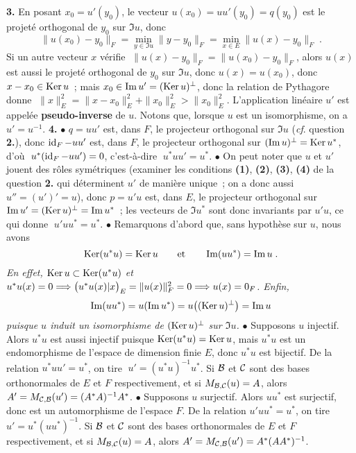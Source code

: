 \documentclass{article}
\begin{document}
\msk
{\bf 3.} En posant $x_0=u'(y_0)$, le vecteur $u(x_0)=uu'(y_0)=q(y_0)$ est le projet\'e orthogonal de $y_0$ sur $\Im u$, donc\vvvv
$$\|u(x_0)-y_0\|_F=\min_{y\in\Im u}\|y-y_0\|_F=\min_{x\in E}\|u(x)-y_0\|_F\;.$$\sect
Si un autre vecteur $x$ v\'erifie $\;\|u(x)-y_0\|_F=\|u(x_0)-y_0\|_F$, alors $u(x)$ est aussi le projet\'e orthogonal de $y_0$ sur $\Im u$, donc $u(x)=u(x_0)$, donc $x-x_0\in\mathop{\rm Ker}\nolimits u$~; mais $x_0\in\mathop{\rm Im}\nolimits u'=(\mathop{\rm Ker}\nolimits u)^\perp$, donc la relation de Pythagore donne $\;\|x\|_E^2=\|x-x_0\|_E^2+\|x_0\|_E^2>\|x_0\|_E^2$.\msk\sect
L'application lin\'eaire $u'$ est appel\'ee {\bf pseudo-inverse} de $u$. Notons que, lorsque $u$ est un isomorphisme, on a $u'=u^{-1}$.
\msk
{\bf 4.} $\bullet$ $q=uu'$ est, dans $F$, le projecteur orthogonal sur $\Im u$ ({\it cf}. question {\bf 2.}), donc $\mathop{\rm id}\nolimits_F-uu'$ est, dans $F$, le projecteur orthogonal sur $(\mathop{\rm Im}\nolimits u)^\perp=\mathop{\rm Ker}\nolimits u^*$, d'o\`u $\;u^*(\mathop{\rm id}\nolimits_F-uu')=0$, c'est-\`a-dire $\;u^*uu'=u^*$.
\msk\sect
$\bullet$ On peut noter que $u$ et $u'$ jouent des r\^oles sym\'etriques (examiner les conditions {\bf (1)}, {\bf (2)}, {\bf (3)}, {\bf (4)} de la question {\bf 2.} qui d\'eterminent $u'$ de mani\`ere unique~; on a donc aussi $u''=(u')'=u$), donc $p=u'u$ est, dans $E$, le projecteur orthogonal sur $\mathop{\rm Im}\nolimits u'=(\mathop{\rm Ker}\nolimits u)^\perp=\mathop{\rm Im}\nolimits u^*$~; les vecteurs de $\Im u^*$ sont donc invariants par $u'u$, ce qui donne $\;u'uu^*=u^*$.
\msk\sect
$\bullet$ Remarquons d'abord que, sans hypoth\`ese sur $u$, nous avons\vv
$$\mathop{\rm Ker}\nolimits(u^*u)=\mathop{\rm Ker}\nolimits u\qquad{\rm et}\qquad\mathop{\rm Im}\nolimits(uu^*)=\mathop{\rm Im}\nolimits u\;.$$
{\it En effet, $\mathop{\rm Ker}\nolimits u\subset\mathop{\rm Ker}\nolimits(u^*u)$ et $u^*u(x)=0\Longrightarrow\big(u^*u(x)|x\big)_E=\|u(x)\|_F^2=0\Longrightarrow u(x)=0_F$. Enfin,\vvvv
$$\mathop{\rm Im}\nolimits(uu^*)=u(\mathop{\rm Im}\nolimits u^*)=u\big((\mathop{\rm Ker}\nolimits u)^\perp\big)=\mathop{\rm Im}\nolimits u$$
puisque $u$ induit un isomorphisme de $(\mathop{\rm Ker}\nolimits u)^\perp$ sur $\Im u$.}
\msk\sect
$\bullet$ Supposons $u$ injectif. Alors $u^*u$ est aussi injectif puisque $\mathop{\rm Ker}\nolimits(u^*u)=\mathop{\rm Ker}\nolimits u$, mais $u^*u$ est un endomorphisme de l'espace de dimension finie $E$, donc $u^*u$ est bijectif. De la relation $u^*uu'=u^*$, on tire $\;u'=(u^*u)^{-1}u^*$.\ssk\new
Si ${\cal B}$ et ${\cal C}$ sont des bases orthonormales de $E$ et $F$ respectivement, et si $M_{{\cal B},{\cal C}}(u)=A$, alors $A'=M_{{\cal C},{\cal B}}(u')=(A^*A)^{-1}A^*$.
\msk\sect
$\bullet$ Supposons $u$ surjectif. Alors $uu^*$ est surjectif, donc est un automorphisme de l'espace $F$. De la relation $u'uu^*=u^*$, on tire $u'=u^*(uu^*)^{-1}$.\ssk\new
Si ${\cal B}$ et ${\cal C}$ sont des bases orthonormales de $E$ et $F$ respectivement, et si $M_{{\cal B},{\cal C}}(u)=A$, alors $A'=M_{{\cal C},{\cal B}}(u')=A^*(AA^*)^{-1}$.
\end{document}
